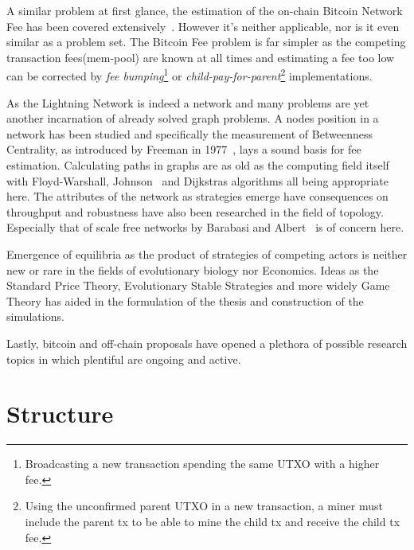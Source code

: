 	A similar problem at first glance, the estimation of the on-chain Bitcoin Network Fee has been covered extensively~\cite{mosterland:transaction:fee, houy:transaction:fee}. However it's neither applicable, nor is it even similar as a problem set. The Bitcoin Fee problem is far simpler as the competing transaction fees(mem-pool) are known at all times and estimating a fee too low can be corrected by \textit{fee bumping}\footnote{Broadcasting a new transaction spending the same UTXO with a higher fee.} or \textit{child-pay-for-parent}\footnote{Using the unconfirmed parent UTXO in a new transaction, a miner must include the parent tx to be able to mine the child tx and receive the child tx fee.} implementations.
	
	As the Lightning Network is indeed a network and many problems are yet another incarnation of already solved graph problems. A nodes position in a network has been studied and specifically the measurement of Betweenness Centrality, as introduced by Freeman in 1977~\cite{brandes:betweenness:centrality:algorithm}, lays a sound basis for fee estimation. Calculating paths in graphs are as old as the computing field itself with Floyd-Warshall, Johnson~\cite{johnson:shortest:path:sparse:network} and Dijkstras algorithms all being appropriate here. The attributes of the network as strategies emerge have consequences on throughput and robustness have also been researched in the field of topology. Especially that of scale free networks by Barabasi and Albert~\cite{barabasi:albert:emergent:scaling} is of concern here.
	
	Emergence of equilibria as the product of strategies of competing actors is neither new or rare in the fields of evolutionary biology nor Economics. Ideas as the Standard Price Theory, Evolutionary Stable Strategies and more widely Game Theory has aided in the formulation of the thesis and construction of the simulations.
	
	Lastly, \gls{bitcoin} and off-chain proposals have opened a plethora of possible research topics in which plentiful are ongoing and active.  
	
	
\section{Structure}

